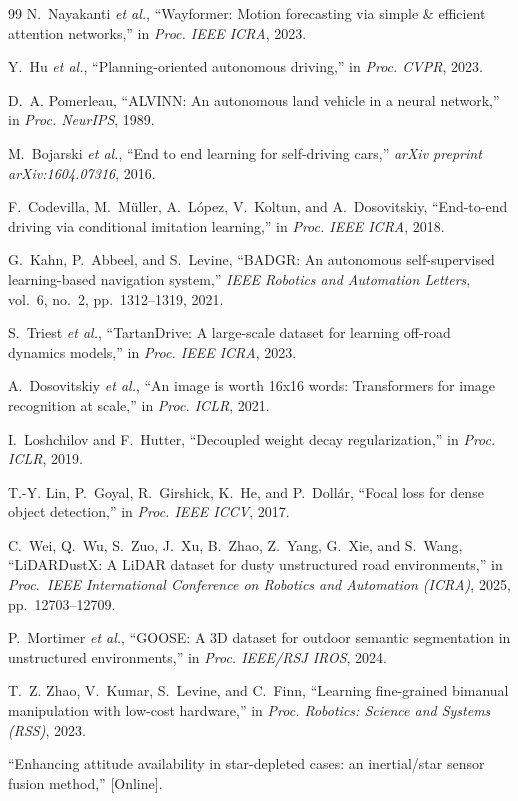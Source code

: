 \documentclass[sensors,article,submit,pdftex,moreauthors]{Definitions/mdpi}
\providecommand{\DIFadd}[1]{{\protect\color{red}#1}} %
\providecommand{\DIFaddbegin}{} %
\providecommand{\DIFaddend}{} %
\providecommand{\DIFaddincludegraphics}[2][]{{\color{blue}\fbox{\DIFOincludegraphics[#1]{#2}}}} %
\DeclareRobustCommand{\DIFaddbegin}{\DIFOaddbegin \let\includegraphics\DIFaddincludegraphics} %
\DeclareRobustCommand{\DIFaddend}{\DIFOaddend \let\includegraphics\DIFOincludegraphics} %
\begin{document}
\begin{thebibliography}{99}
N.~Nayakanti \textit{et al.}, ``Wayformer: Motion forecasting via simple \& efficient attention networks,'' in \textit{Proc. IEEE ICRA}, 2023.

Y.~Hu \textit{et al.}, ``Planning-oriented autonomous driving,'' in \textit{Proc. CVPR}, 2023.

D.~A. Pomerleau, ``ALVINN: An autonomous land vehicle in a neural network,'' in \textit{Proc. NeurIPS}, 1989.

M.~Bojarski \textit{et al.}, ``End to end learning for self-driving cars,'' \textit{arXiv preprint arXiv:1604.07316}, 2016.

F.~Codevilla, M.~M{\"u}ller, A.~L{\'o}pez, V.~Koltun, and A.~Dosovitskiy, ``End-to-end driving via conditional imitation learning,'' in \textit{Proc. IEEE ICRA}, 2018.

G.~Kahn, P.~Abbeel, and S.~Levine, ``BADGR: An autonomous self-supervised learning-based navigation system,'' \textit{IEEE Robotics and Automation Letters}, vol.~6, no.~2, pp.~1312--1319, 2021.

S.~Triest \textit{et al.}, ``TartanDrive: A large-scale dataset for learning off-road dynamics models,'' in \textit{Proc. IEEE ICRA}, 2023.

A.~Dosovitskiy \textit{et al.}, ``An image is worth 16x16 words: Transformers for image recognition at scale,'' in \textit{Proc. ICLR}, 2021.

I.~Loshchilov and F.~Hutter, ``Decoupled weight decay regularization,'' in \textit{Proc. ICLR}, 2019.

T.-Y. Lin, P.~Goyal, R.~Girshick, K.~He, and P.~Doll{\'a}r, ``Focal loss for dense object detection,'' in \textit{Proc. IEEE ICCV}, 2017.

C.~Wei, Q.~Wu, S.~Zuo, J.~Xu, B.~Zhao, Z.~Yang, G.~Xie, and S.~Wang, ``LiDARDustX: A LiDAR dataset for dusty unstructured road environments,'' in \textit{Proc.\ IEEE International Conference on Robotics and Automation (ICRA)}, 2025, pp.~12703--12709.

P.~Mortimer \textit{et al.}, ``GOOSE: A 3D dataset for outdoor semantic segmentation in unstructured environments,'' in \textit{Proc. IEEE/RSJ IROS}, 2024.

T.~Z. Zhao, V.~Kumar, S.~Levine, and C.~Finn, ``Learning fine-grained bimanual manipulation with low-cost hardware,'' in \textit{Proc. Robotics: Science and Systems (RSS)}, 2023.
\DIFaddbegin 

\DIFadd{``Enhancing attitude availability in star-depleted cases: an inertial/star sensor fusion method,'' }[\DIFadd{Online}]\DIFadd{.
}\DIFaddend 

\end{thebibliography}
\end{document}
